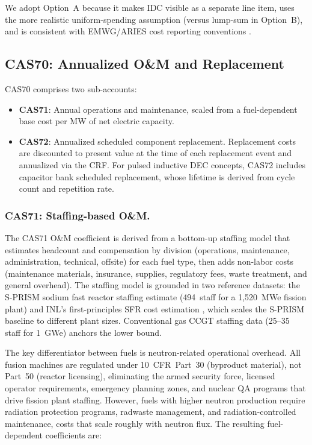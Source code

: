 \documentclass{article}
\begin{document}
\noindent We adopt Option~A because it makes IDC visible as a separate
line item, uses the more realistic uniform-spending assumption (versus
lump-sum in Option~B), and is consistent with EMWG/ARIES cost reporting
conventions \citep{emwg2007}.

\subsection{CAS70: Annualized O\&M and Replacement}
\label{sec:cas70}

CAS70 comprises two sub-accounts:

\begin{itemize}
\item \textbf{CAS71}: Annual operations and maintenance, scaled from
  a fuel-dependent base cost per MW of net electric capacity.
\item \textbf{CAS72}: Annualized scheduled component replacement.
  Replacement costs are discounted to present value at the time of
  each replacement event and annualized via the CRF.  For pulsed
  inductive DEC concepts, CAS72 includes capacitor bank scheduled
  replacement, whose lifetime is derived from cycle count and
  repetition rate.
\end{itemize}

\subsubsection{CAS71: Staffing-based O\&M.}
The CAS71 O\&M coefficient is derived from a bottom-up staffing model
that estimates headcount and compensation by division (operations,
maintenance, administration, technical, offsite) for each fuel type,
then adds non-labor costs (maintenance materials, insurance, supplies,
regulatory fees, waste treatment, and general overhead). The staffing
model is grounded in two reference datasets: the S-PRISM sodium fast
reactor staffing estimate \citep{boardman2000} (494~staff for a
1,520~MWe fission plant) and INL's first-principles SFR cost
estimation \citep{prosser2024}, which scales the S-PRISM baseline to
different plant sizes. Conventional gas CCGT staffing data (25--35
staff for 1~GWe) anchors the lower bound.

The key differentiator between fuels is neutron-related operational
overhead. All fusion machines are regulated under 10~CFR~Part~30
(byproduct material), not Part~50 (reactor licensing), eliminating
the armed security force, licensed operator requirements, emergency
planning zones, and nuclear QA programs that drive fission plant
staffing. However, fuels with higher neutron production require
radiation protection programs, radwaste management, and
radiation-controlled maintenance, costs that scale roughly with
neutron flux. The resulting fuel-dependent coefficients are:
\end{document}
